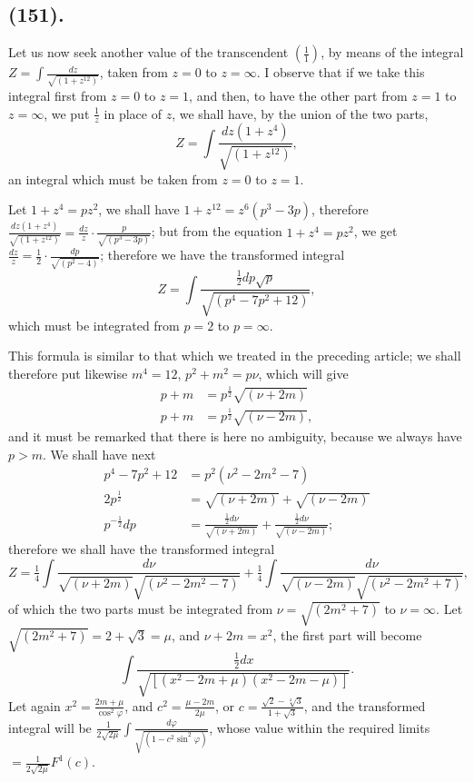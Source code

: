 \documentclass{article}
\begin{document}
\subsection*{(151).}

Let us now seek another value of the transcendent $\left(\frac{1}{1}\right)$, by means of the integral $Z=\displaystyle\int\frac{dz}{\sqrt{(1+z^{12})}}$, taken from $z=0$ to $z=\infty$. I observe that if we take this integral first from $z=0$ to $z=1$, and then, to have the other part from $z=1$ to $z=\infty$, we put $\frac{1}{z}$ in place of $z$, we shall have, by the union of the two parts,
\[ Z=\int\frac{dz(1+z^{4})}{\sqrt{(1+z^{12})}}, \]
an integral which must be taken from $z=0$ to $z=1$.


Let $1+z^{4}=pz^{2}$, we shall have $1+z^{12}=z^{6}(p^{3}-3p)$, therefore $\frac{dz(1+z^{4})}{\sqrt{(1+z^{12})}}=\frac{dz}{z}\cdot\frac{p}{\sqrt{(p^{3}-3p)}}$; but from the equation $1+z^{4}=pz^{2}$, we get $\frac{dz}{z}=\frac{1}{2}\cdot\frac{dp}{\sqrt{(p^{2}-4)}}$; therefore we have the transformed integral
\[ Z=\int\frac{\tfrac{1}{2}dp\sqrt{p}}{\sqrt{(p^{4}-7p^{2}+12)}}, \]
which must be integrated from $p=2$ to $p=\infty$.

This formula is similar to that which we treated in the preceding article; we shall therefore put likewise $m^{4}=12$, $p^{2}+m^{2}=p\nu$, which will give
\[ \begin{aligned} p+m&=p^{\frac{1}{2}}\sqrt{(\nu+2m)}\\ p+m&=p^{\frac{1}{2}}\sqrt{(\nu-2m)}, \end{aligned} \]
and it must be remarked that there is here no ambiguity, because we always have $p>m$. We shall have next
\[ \begin{aligned} p^{4}-7p^{2}+12&=p^{2}(\nu^{2}-2m^{2}-7)\\ 2p^{\frac{1}{2}}&=\sqrt{(\nu+2m)}+\sqrt{(\nu-2m)}\\ p^{-\frac{1}{2}}dp&=\frac{\tfrac{1}{2}d\nu}{\sqrt{(\nu+2m)}}+\frac{\tfrac{1}{2}d\nu}{\sqrt{(\nu-2m)}}; \end{aligned} \]
therefore we shall have the transformed integral
\[ Z=\tfrac{1}{4}\int\frac{d\nu}{\sqrt{(\nu+2m)}\sqrt{(\nu^{2}-2m^{2}-7)}}+\tfrac{1}{4}\int\frac{d\nu}{\sqrt{(\nu-2m)}\sqrt{(\nu^{2}-2m^{2}+7)}}, \]
of which the two parts must be integrated from $\nu=\sqrt{(2m^{2}+7)}$ to $\nu=\infty$. Let $\sqrt{(2m^{2}+7)}=2+\sqrt{3}=\mu$, and $\nu+2m=x^{2}$, the first part will become
\[ \int\frac{\tfrac{1}{2}dx}{\sqrt{[(x^{2}-2m+\mu)(x^{2}-2m-\mu)]}}. \]
Let again $x^{2}=\frac{2m+\mu}{\cos^{2}\varphi}$, and $c^{2}=\frac{\mu-2m}{2\mu}$, or $c=\frac{\sqrt{2}-\sqrt[4]{3}}{1+\sqrt{3}}$, and the transformed integral will be $\frac{1}{2\sqrt{2\mu}}\displaystyle\int\frac{d\varphi}{\sqrt{(1-c^{2}\sin^{2}\varphi)}}$, whose value within the required limits $=\frac{1}{2\sqrt{2\mu}}F^{1}(c)$.
\end{document}
